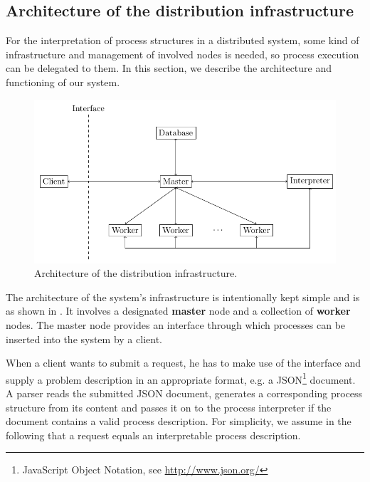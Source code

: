 \subsection{Architecture of the distribution infrastructure}
\label{chp:infrastructure}
For the interpretation of process structures in a distributed system, some kind of infrastructure and management of involved nodes is needed, so process execution can be delegated to them. In this section, we describe the architecture and functioning of our system.
\vspace*{-0.5em}
\begin{figure}[h!]
  \centering
  \includegraphics[width=\textwidth]{img/architecture.pdf}
  \caption{Architecture of the distribution infrastructure.}
  \vspace*{-0.5em}
  \label{fig:architecture}
\end{figure}

The architecture of the system's infrastructure is intentionally kept simple and is as shown in . It involves a designated \textbf{master} node and a collection of \textbf{worker} nodes. The master node provides an interface through which processes can be inserted into the system by a client.

When a client wants to submit a request, he has to make use of the interface and supply a problem description in an appropriate format, e.g. a JSON\footnote{JavaScript Object Notation, see \url{http://www.json.org/}} document. A parser reads the submitted JSON document, generates a corresponding process structure from its content and passes it on to the process interpreter if the document contains a valid process description. For simplicity, we assume in the following that a request equals an interpretable process description.

